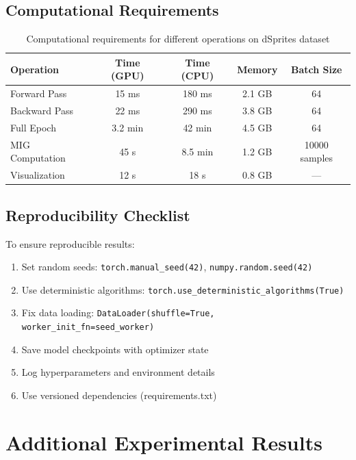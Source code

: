 \documentclass[conference]{IEEEtran}
\begin{document}
\subsection{Computational Requirements}

\begin{table}[H]
\centering
\begin{tabular}{@{}lcccc@{}}
\toprule
\textbf{Operation} & \textbf{Time (GPU)} & \textbf{Time (CPU)} & \textbf{Memory} & \textbf{Batch Size} \\ \midrule
Forward Pass & 15 ms & 180 ms & 2.1 GB & 64 \\
Backward Pass & 22 ms & 290 ms & 3.8 GB & 64 \\
Full Epoch & 3.2 min & 42 min & 4.5 GB & 64 \\
MIG Computation & 45 s & 8.5 min & 1.2 GB & 10000 samples \\
Visualization & 12 s & 18 s & 0.8 GB & --- \\ \bottomrule
\end{tabular}
\caption{Computational requirements for different operations on dSprites dataset}
\label{tab:computation}
\end{table}

\subsection{Reproducibility Checklist}

To ensure reproducible results:
\begin{enumerate}
    \item Set random seeds: \texttt{torch.manual\_seed(42)}, \texttt{numpy.random.seed(42)}
    \item Use deterministic algorithms: \texttt{torch.use\_deterministic\_algorithms(True)}
    \item Fix data loading: \texttt{DataLoader(shuffle=True, worker\_init\_fn=seed\_worker)}
    \item Save model checkpoints with optimizer state
    \item Log hyperparameters and environment details
    \item Use versioned dependencies (requirements.txt)
\end{enumerate}

\section{Additional Experimental Results}
\end{document}
